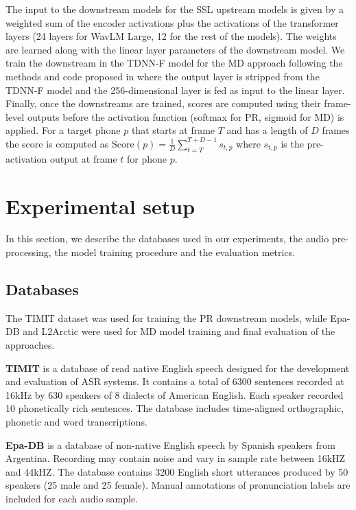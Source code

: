 \documentclass{INTERSPEECH2023}
\begin{document}
The input to the downstream models for the SSL upstream models is given by a weighted sum of the encoder activations plus the activations of the transformer layers (24 layers for WavLM Large, 12 for the rest of the models). The weights are learned along with the linear layer parameters of the downstream model. We train the downstream in the TDNN-F model for the MD approach following the methods and code proposed in \cite{sancinetti2022transfer} where the output layer is stripped from the TDNN-F model and the 256-dimensional layer is fed as input to the linear layer. 
Finally, once the downstreams are trained, scores are computed using their frame-level outputs before the activation function (softmax for PR, sigmoid for MD) is applied. For a target phone $p$ that starts at frame $T$ and has a length of $D$ frames the score is computed as $ \mathrm{Score}(p)=\frac{1}{D}\sum_{t=T}^{T+D-1} s_{t,p}$
where $s_{t,p}$ is the pre-activation output at frame $t$ for phone $p$.



\section{Experimental setup}
In this section, we describe the databases used in our experiments, the audio pre-processing, the model training procedure and the evaluation metrics.
\subsection{Databases}
\label{sec:dbs}
The TIMIT dataset was used for training the PR downstream models, while Epa-DB and L2Arctic were used for MD model training and final evaluation of the approaches. 

\textbf{TIMIT} \cite{timit:1993} is a database of read native English speech designed for the development and evaluation of ASR systems. It contains a total of 6300 sentences recorded at 16kHz by 630 speakers of 8 dialects of American English. Each speaker recorded 10 phonetically rich sentences. The database includes  time-aligned orthographic, phonetic and word transcriptions. 

\textbf{Epa-DB} \cite{vidal2019epadb} is a database of non-native English speech by Spanish speakers from Argentina. Recording may contain noise and vary in sample rate between 16kHZ and 44kHZ. The database contains 3200 English short utterances produced by 50 speakers (25 male and 25 female). Manual annotations of pronunciation labels are included for each audio sample.
\end{document}

